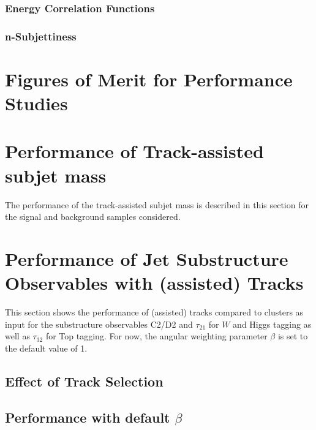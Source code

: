 \documentclass[UKenglish,texlive=2013]{\ATLASLATEXPATH atlasdoc}
\begin{document}


\subsubsection{Energy Correlation Functions}\label{subsec:ECF}


\subsubsection{n-Subjettiness}\label{subsec:nSub}


\section{Figures of Merit for Performance Studies}\label{sec:FoM}


\clearpage
\section{Performance of Track-assisted subjet mass}
\label{sec:mtas}
The performance of the track-assisted subjet mass is described in this section for the signal and background samples considered.

\clearpage
\section{Performance of Jet Substructure Observables with (assisted) Tracks}\label{sec:def_beta}
This section shows the performance of (assisted) tracks compared to clusters as input for the substructure observables C2/D2 and $\tau_{21}$ for $W$ and Higgs tagging as well as $\tau_{32}$ for Top tagging. For now, the angular weighting parameter $\beta$ is set to the default value of 1.
\subsection{Effect of Track Selection}


\subsection{Performance with default $\beta$}

\end{document}
